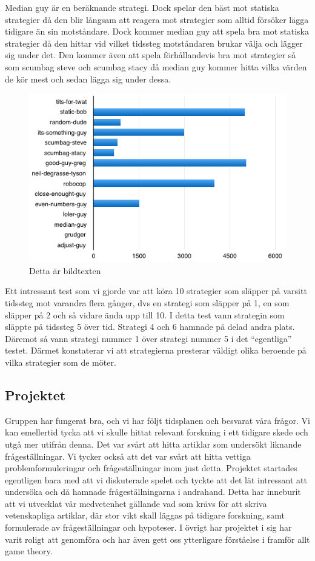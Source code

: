 Median guy är en beräknande strategi. Dock spelar den bäst mot statiska strategier då den blir långsam att reagera mot strategier som alltid försöker lägga tidigare än sin motståndare. Dock kommer median guy att spela bra mot statiska strategier då den hittar vid vilket tidssteg motståndaren brukar välja och lägger sig under det. Den kommer även att spela förhållandevis bra mot strategier så som scumbag steve och scumbag stacy då median guy kommer hitta vilka värden de kör mest och sedan lägga sig under dessa.

\begin{figure}[H]
	\begin{center}
	\includegraphics[scale=0.75, angle=0]{bilder/median-guy.png}
	\caption{Detta är bildtexten}
	\label{median-guy}
	\end{center}
\end{figure}


Ett intressant test som vi gjorde var att köra 10 strategier som släpper på varsitt tidssteg mot varandra flera gånger, dvs en strategi som släpper på 1, en som släpper på 2 och så vidare ända upp till 10. I detta test vann strategin som släppte på tidssteg 5 över tid. Strategi 4 och 6 hamnade på delad andra plats. Däremot så vann strategi nummer 1 över strategi nummer 5 i det “egentliga” testet. Därmet konstaterar vi att strategierna presterar väldigt olika beroende på vilka strategier som de möter.

\subsection{Projektet}
Gruppen har fungerat bra, och vi har följt tidsplanen och besvarat våra frågor. Vi kan emellertid tycka att vi skulle hittat relevant forskning i ett tidigare skede och utgå mer utifrån denna. Det var svårt att hitta artiklar som undersökt liknande frågeställningar. Vi tycker också att det var svårt att hitta vettiga problemformuleringar och frågeställningar inom just detta. Projektet startades egentligen bara med att vi diskuterade spelet och tyckte att det lät intressant att undersöka och då hamnade frågeställningarna i andrahand. Detta har inneburit att vi utvecklat vår medvetenhet gällande vad som krävs för att skriva vetenskapliga artiklar, där stor vikt skall läggas på tidigare forskning, samt formulerade av frågeställningar och hypoteser. I övrigt har projektet i sig har varit roligt att genomföra och har även gett oss ytterligare förståelse i framför allt game theory.